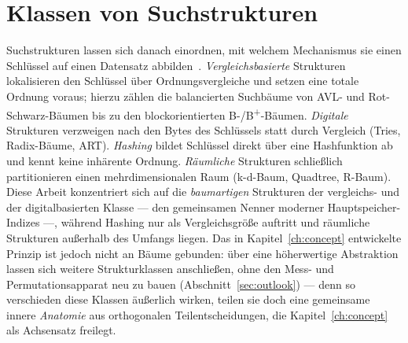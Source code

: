 \section{Klassen von Suchstrukturen}\label{sec:search-classes}
Suchstrukturen lassen sich danach einordnen, mit welchem Mechanismus sie einen Schlüssel auf einen
Datensatz abbilden~\cite{knuth1998taocp3}\@. \emph{Vergleichsbasierte} Strukturen lokalisieren den
Schlüssel über Ordnungsvergleiche und setzen eine totale Ordnung voraus; hierzu zählen die
balancierten Suchbäume von AVL- und Rot-Schwarz-Bäumen bis zu den blockorientierten
B-/B\textsuperscript{+}-Bäumen\@. \emph{Digitale} Strukturen verzweigen nach den Bytes des Schlüssels
statt durch Vergleich (Tries, Radix-Bäume, ART)\@. \emph{Hashing} bildet Schlüssel direkt über eine
Hashfunktion ab und kennt keine inhärente Ordnung\@. \emph{Räumliche} Strukturen schließlich
partitionieren einen mehrdimensionalen Raum (k-d-Baum, Quadtree, R-Baum). Diese Arbeit konzentriert
sich auf die \emph{baumartigen} Strukturen der vergleichs- und der digitalbasierten Klasse --- den
gemeinsamen Nenner moderner Hauptspeicher-Indizes ---, während Hashing nur als Vergleichsgröße
auftritt und räumliche Strukturen außerhalb des Umfangs liegen. Das in Kapitel~\ref{ch:concept}
entwickelte Prinzip ist jedoch nicht an Bäume gebunden: über eine höherwertige Abstraktion lassen
sich weitere Strukturklassen anschließen, ohne den Mess- und Permutationsapparat neu zu bauen
(Abschnitt~\ref{sec:outlook}) --- denn so verschieden diese Klassen äußerlich wirken, teilen sie
doch eine gemeinsame innere \emph{Anatomie} aus orthogonalen Teilentscheidungen, die
Kapitel~\ref{ch:concept} als Achsensatz freilegt.

